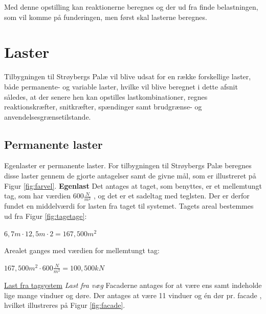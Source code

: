 Med denne opstilling kan reaktionerne beregnes og der ud fra finde belastningen, som vil komme på funderingen, men først skal lasterne beregnes.

\section{Laster}
Tilbygningen til Strøybergs Palæ vil blive udsat for en række forskellige laster, både permanente- og variable laster, hvilke vil blive beregnet i dette afsnit således, at der senere hen kan opstilles lastkombinationer, regnes reaktionskræfter, snitkræfter, spændinger samt brudgrænse- og anvendelsesgrænsetilstande.

\subsection{Permanente laster}
Egenlaster er permanente laster. For tilbygningen til Strøybergs Palæ beregnes disse laster gennem de gjorte antagelser samt de givne mål, som er illustreret på Figur \ref{fig:farvel}.
\newline
\newline
\textbf{Egenlast}
\newline
Det antages at taget, som benyttes, er et mellemtungt tag, som har værdien $600 \frac{N}{m^2}$ \citep{tag}, og det er et sadeltag med teglsten. Der er derfor fundet en middelværdi for lasten fra taget til systemet. 
\newline
\newline
Tagets areal bestemmes ud fra Figur \ref{fig:tagetage}:
\begin{center}
	$6,\!7 m\cdot 12,\!5 m \cdot 2=167,\!500 m^2$
\end{center}

Arealet ganges med værdien for mellemtungt tag:
\begin{center}
	$167,\!500 m^2\cdot 600 \frac{N}{m^2}=100,\!500 kN$
\end{center}

\underline{Last fra tagsystem}
\newline
\textit{Last fra væg}
\newline
Facaderne antages for at være ens samt indeholde lige mange vinduer og døre. Der antages at være 11 vinduer og én dør pr. facade \citep{gammellokalplan}, hvilket illustreres på Figur \ref{fig:facade}.

